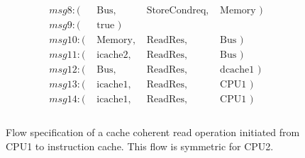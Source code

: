 \documentclass[12pt,frontmatter,copyright,thesis]{usfmanus}
\begin{document}
\begin{appendix}
\begin{figure}
 \begin{minipage}{.5\textwidth}
  {\footnotesize
 \[
 \begin{array}{llll}
 msg8: (&\mbox{ Bus},&\mbox{ StoreCondreq},&\mbox{ Memory })\\
 msg9: (&\mbox{ true                                        })\\
 msg10: (&\mbox{ Memory},&\mbox{ ReadRes},&\mbox{ Bus            })\\    
 msg11: (&\mbox{ icache2},&\mbox{ ReadRes},&\mbox{ Bus })\\
 msg12: (&\mbox{ Bus},&\mbox{ ReadRes},&\mbox{ dcache1      })\\            
 msg13: (&\mbox{ icache1},&\mbox{ ReadRes},&\mbox{ CPU1          })\\  
 msg14: (&\mbox{ icache1},&\mbox{ ReadRes},&\mbox{ CPU1 })\\\\
 \end{array}
 \]}
 \end{minipage}
 \caption{\footnotesize Flow specification of a cache coherent read operation initiated from CPU1 to instruction cache. \footnotesize This flow is symmetric for CPU2. }
 \label{read-flow} 
 \end{figure}
 

\end{appendix}
\end{document}
